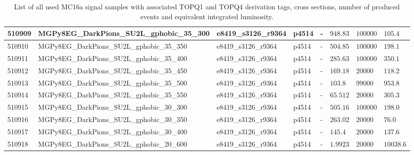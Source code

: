 \begin{table}[!hbtp]
{\begin{tabular}{llllllll}
    \hline
    510909 & MGPy8EG\_DarkPions\_SU2L\_gphobic\_35\_300 & e8419\_s3126\_r9364 & p4514 & - & $948.83$ & $100000$ & $105.4$\\
    \hline
    510910 & MGPy8EG\_DarkPions\_SU2L\_gphobic\_35\_350 & e8419\_s3126\_r9364 & p4514 & - & $504.85$ & $100000$ & $198.1$\\
    \hline
    510911 & MGPy8EG\_DarkPions\_SU2L\_gphobic\_35\_400 & e8419\_s3126\_r9364 & p4514 & - & $285.63$ & $100000$ & $350.1$\\
    \hline
    510912 & MGPy8EG\_DarkPions\_SU2L\_gphobic\_35\_450 & e8419\_s3126\_r9364 & p4514 & - & $169.18$ & $20000$ & $118.2$\\
    \hline
    510913 & MGPy8EG\_DarkPions\_SU2L\_gphobic\_35\_500 & e8419\_s3126\_r9364 & p4514 & - & $103.8$ & $99000$ & $953.8$\\
    \hline
    510914 & MGPy8EG\_DarkPions\_SU2L\_gphobic\_35\_550 & e8419\_s3126\_r9364 & p4514 & - & $65.512$ & $20000$ & $305.3$\\
    \hline
    510915 & MGPy8EG\_DarkPions\_SU2L\_gphobic\_30\_300 & e8419\_s3126\_r9364 & p4514 & - & $505.16$ & $100000$ & $198.0$\\
    \hline
    510916 & MGPy8EG\_DarkPions\_SU2L\_gphobic\_30\_350 & e8419\_s3126\_r9364 & p4514 & - & $263.02$ & $20000$ & $76.0$\\
    \hline
    510917 & MGPy8EG\_DarkPions\_SU2L\_gphobic\_30\_400 & e8419\_s3126\_r9364 & p4514 & - & $145.4$ & $20000$ & $137.6$\\
    \hline
    510918 & MGPy8EG\_DarkPions\_SU2L\_gphobic\_20\_600 & e8419\_s3126\_r9364 & p4514 & - & $1.9923$ & $20000$ & $10038.6$\\
    \hline
    \hline
  \end{tabular}%
  }
  \caption{List of all used MC16a signal samples with associated TOPQ1 and TOPQ4 derivation tags, cross sections, number of produced events and equivalent integrated luminosity.}
  \label{tab:MC16a_signal_samples}
\end{table}

